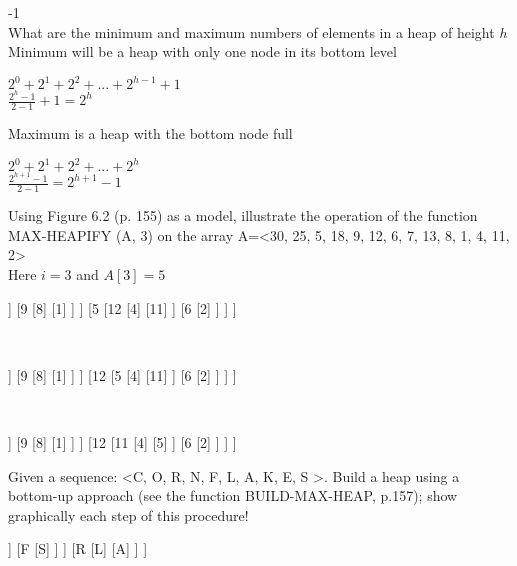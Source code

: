 \documentclass[12pt,largemargins]{homework}
\begin{document}
\maketitle
{}-1\\
What are the minimum and maximum numbers of elements in a heap of height $ h $\\
Minimum will be a heap with only one node in its bottom level\\
\begin{center}
$ 2^0 + 2^1 + 2^2 + ... + 2^{h-1} + 1 $\\
$ \frac{2^{h} - 1 }{2 - 1} + 1 = 2^h$\\
\end{center}
Maximum is a heap with the bottom node full\\
\begin{center}
$ 2^0 + 2^1 + 2^2 + ... + 2^{h}$\\
$ \frac{2^{h+1} - 1}{2 - 1}  = 2^{h + 1} -1$\\
\end{center}
\question
Using Figure 6.2 (p. 155) as a model, illustrate the operation of the function MAX-HEAPIFY (A, 3) on the array A=<30, 25, 5, 18, 9, 12, 6, 7, 13, 8, 1, 4, 11, 2>\\
Here $ i = 3 $ and $ A[3]=5 $
\begin{center}
	\begin{forest}
		[30
			[25
				[18
					[7]
					[13]
				]
				[9
					[8]
					[1]
				]
			]
			[5
				[12
					[4]
					[11]
				]
					[6
					[2]
				]
			]
		]
	\end{forest}\\
	\begin{forest}
		[30
			[25
				[18
					[7]
					[13]
				]
				[9
					[8]
					[1]
				]
			]
			[12
				[5
					[4]
					[11]
				]
				[6
					[2]
				]
			]
		]
	\end{forest}\\
	\begin{forest}
		[30
			[25
				[18
					[7]
					[13]
				]
				[9
					[8]
					[1]
				]
			]
			[12
				[11
					[4]
					[5]
				]
				[6
					[2]
				]
			]
		]
	\end{forest}
\end{center}
\question
Given a sequence: <C, O, R, N, F, L, A, K, E, S >. Build a heap using a bottom-up approach (see the function BUILD-MAX-HEAP, p.157); show graphically each step of this procedure!\\
\begin{forest}
	[C
		[O
			[N
				[K]
				[E]
			]
			[F
				[S]
			]
		]
		[R
			[L]
			[A]
		]
	]
\end{forest}
\end{document}
